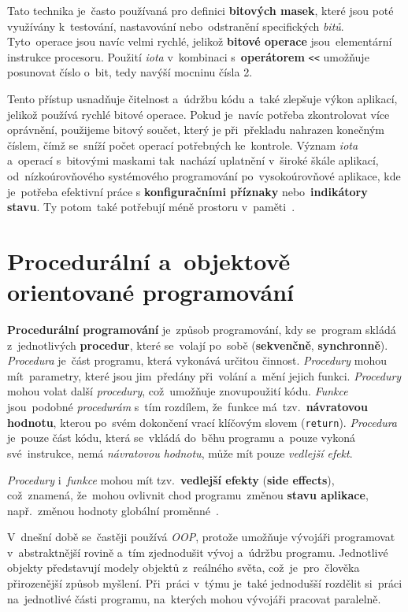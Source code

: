 \documentclass[11pt,a4paper]{report}
\let\oldacrshort\acrshort
\renewcommand{\acrshort}[1]{\emph{\normalsize\color[rgb]{0,0,0}\noindent\oldacrshort{#1}}}
\begin{document}
            Tato technika je~často používaná pro definici \textbf{bitových masek}, které jsou poté využívány k~testování, nastavování nebo~odstranění specifických \emph{bitů}. Tyto~operace jsou navíc velmi rychlé, jelikož \textbf{bitové operace} jsou~elementární instrukce procesoru. Použití \emph{iota} v~kombinaci s~\textbf{operátorem} \texttt{<<} umožňuje posunovat číslo o~bit, tedy navýší mocninu čísla 2.
            
            Tento přístup usnadňuje čitelnost a~údržbu kódu a~také zlepšuje výkon aplikací, jelikož používá rychlé bitové operace. Pokud je~navíc potřeba zkontrolovat více oprávnění, použijeme bitový součet, který je při~překladu nahrazen konečným číslem, čímž se~sníží počet operací potřebných ke~kontrole. Význam \emph{iota} a~operací s~bitovými maskami tak~nachází uplatnění v~široké škále aplikací, od~nízkoúrovňového systémového programování po~vysokoúrovňové aplikace, kde je~potřeba efektivní práce s \textbf{konfiguračními příznaky} nebo~\textbf{indikátory stavu}. Ty potom~také potřebují méně prostoru v~paměti~\cite{effective_go, compilers}.

        \section{Procedurální a~objektově orientované programování}
            \textbf{Procedurální programování} je~způsob programování, kdy se~program skládá z~jednotlivých \textbf{procedur}, které se~volají po~sobě (\textbf{sekvenčně}, \textbf{synchronně}). \emph{Procedura} je~část programu, která vykonává určitou činnost. \emph{Procedury} mohou mít~parametry, které jsou jim~předány při~volání a~mění jejich funkci. \emph{Procedury} mohou volat další \emph{procedury}, což~umožňuje znovupoužití kódu. \emph{Funkce} jsou~podobné \emph{procedurám} s~tím rozdílem, že~funkce má~tzv.~\textbf{návratovou hodnotu}, kterou po~svém dokončení vrací klíčovým slovem (\texttt{return}). \emph{Procedura} je~pouze část kódu, která se~vkládá do~běhu programu a~pouze vykoná své~instrukce, nemá \emph{návratovou hodnotu}, může mít pouze \emph{vedlejší efekt}.

            \emph{Procedury} i~\emph{funkce} mohou mít tzv.~\textbf{vedlejší efekty} (\textbf{side effects}), což~znamená, že~mohou ovlivnit chod programu~změnou \textbf{stavu aplikace}, např.~změnou hodnoty globální proměnné~\cite{Scott2019:programmingpragmatics}.
            
            V~dnešní době se~častěji používá \acrshort{OOP}, protože umožňuje vývojáři programovat v~abstraktnější rovině a~tím zjednodušit vývoj a~údržbu programu. Jednotlivé objekty představují modely objektů z~reálného světa, což~je~pro~člověka přirozenější způsob myšlení. Při~práci v~týmu je~také jednodušší rozdělit si~práci na~jednotlivé části programu, na~kterých mohou vývojáři pracovat paralelně.
            
\end{document}
